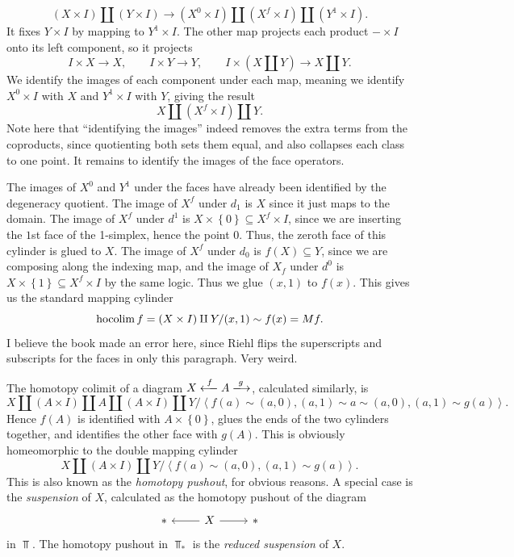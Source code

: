 \[
	(X\times I)\amalg (Y\times I)\to (X^0\times I)\amalg (X^f\times I)\amalg (Y^1\times I)
.\]
It fixes $Y\times I$ by mapping to $Y^1\times I$. The other map projects each product $-\times I$ onto its left component, so it projects
\[
	I\times X\to X,\qquad I\times Y\to Y,\qquad I\times (X\amalg Y)\to X\amalg Y
.\]
We identify the images of each component under each map, meaning we identify $X^0\times I$ with $X$ and $Y^1\times I$ with $Y$, giving the result
\[
	X\amalg (X^f\times I)\amalg Y
.\]
Note here that ``identifying the images'' indeed removes the extra terms from the coproducts, since quotienting both sets them equal, and also collapses each class to one point. It remains to identify the images of the face operators.

The images of $X^0$ and $Y^1$ under the faces have already been identified by the degeneracy quotient. The image of $X^f$ under $d_1$ is $X$ since it just maps to the domain. The image of $X^f$ under $d^1$ is $X\times \left\{ 0 \right\} \subseteq X^f\times I$, since we are inserting the $1$st face of the 1-simplex, hence the point $0$. Thus, the zeroth face of this cylinder is glued to $X$. The image of $X^f$ under $d_0$ is $f(X)\subseteq Y$, since we are composing along the indexing map, and the image of $X_f$ under $d^0$ is $X\times \left\{ 1 \right\} \subseteq X^f\times I$ by the same logic. Thus we glue $(x,1)$ to $f(x)$. This gives us the standard mapping cylinder
\[
	\operatorname*{hocolim} f=(X\times I)\amalg Y/(x,1)\sim f(x)=Mf
.\]
I believe the book made an error here, since Riehl flips the superscripts and subscripts for the faces in only this paragraph. Very weird.

The homotopy colimit of a diagram $X\xlongleftarrow{f}A\xlongrightarrow{g}$, calculated similarly, is
\[
	X\amalg (A\times I)\amalg A\amalg (A\times I)\amalg Y/\left\langle f(a)\sim (a,0),(a,1)\sim a\sim (a,0),(a,1)\sim g(a) \right\rangle 
.\]
Hence $f(A)$ is identified with $A\times \left\{ 0 \right\} $, glues the ends of the two cylinders together, and identifies the other face with $g(A)$. This is obviously homeomorphic to the double mapping cylinder
\[
	X\amalg (A\times I)\amalg Y/\left\langle f(a)\sim (a,0),(a,1)\sim g(a) \right\rangle 
.\]
This is also known as the \emph{homotopy pushout}, for obvious reasons. A special case is the \emph{suspension} of $X$, calculated as the homotopy pushout of the diagram
\[\begin{tikzcd}[row sep = 2.5em, column sep = 2.5em]
* & X\ar[l] \ar[r]  & *
\end{tikzcd}\]
in $\Top $. The homotopy pushout in $\Top _*$ is the \emph{reduced suspension} of $X$.

